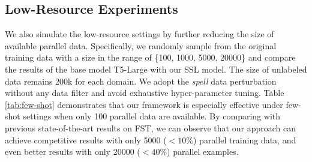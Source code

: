 \subsection{Low-Resource Experiments}
\label{sec:low}
We also simulate the low-resource settings by further reducing the size of available parallel data. Specifically, we randomly sample from the original training data with a size in the range of \{100, 1000, 5000, 20000\} and compare the results of the base model T5-Large with our SSL model. The size of unlabeled data remains 200k for each domain. We adopt the \textit{spell} data perturbation without any data filter and avoid exhaustive hyper-parameter tuning. Table \ref{tab:few-shot} demonstrates that our framework is especially effective under few-shot settings when only 100 parallel data are available. By comparing with previous state-of-the-art results on FST, we can observe that our approach can achieve competitive results with only 5000 ($<10\%$) parallel training data, and even better results with only 20000 ($<40\%$) parallel examples. 



